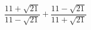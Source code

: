 \begin{ex}[type=calculate]
	\begin{condition}
		\( \dfrac{11+\sqrt{21}}{11-\sqrt{21}}+\dfrac{11-\sqrt{21}}{11+\sqrt{21}} \)
	\end{condition}
\end{ex}